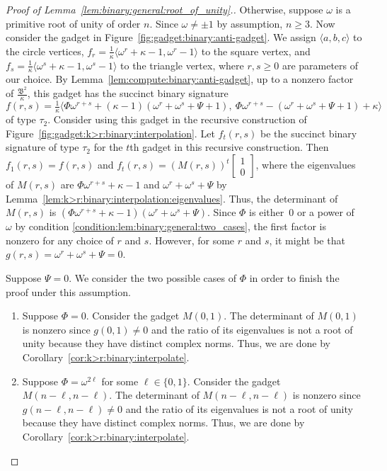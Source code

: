 \documentclass[11pt]{article}
\begin{document}
\begin{proof}[Proof of Lemma~\ref{lem:binary:general:root_of_unity}.]
 Otherwise, suppose $\omega$ is a primitive root of unity of order $n$.
 Since $\omega \not = \pm 1$ by assumption, $n \ge 3$.
 Now consider the gadget in Figure~\ref{fig:gadget:binary:anti-gadget}.
 We assign $\langle a,b,c \rangle$ to the circle vertices,
 $f_r = \frac{1}{\kappa} \langle \omega^r + \kappa - 1, \omega^r - 1 \rangle$ to the square vertex,
 and $f_s = \frac{1}{\kappa} \langle \omega^s + \kappa - 1, \omega^s - 1 \rangle$ to the triangle vertex,
 where $r,s \ge 0$ are parameters of our choice.
 By Lemma~\ref{lem:compute:binary:anti-gadget},
 up to a nonzero factor of $\frac{\mathfrak{B}^2}{\kappa}$,
 this gadget has the succinct binary signature
 \[
  f(r,s) =
  \tfrac{1}{\kappa}
  \langle
   \Phi \omega^{r+s} + (\kappa - 1) (\omega^r + \omega^s + \Psi + 1),\ %
   \Phi \omega^{r+s} -              (\omega^r + \omega^s + \Psi + 1) + \kappa
  \rangle
 \]
 of type $\tau_2$.
 Consider using this gadget in the recursive construction of Figure~\ref{fig:gadget:k>r:binary:interpolation}.
 Let $f_t(r,s)$ be the succinct binary signature of type $\tau_2$ for the $t$th gadget in this recursive construction.
 Then $f_1(r,s) = f(r,s)$ and $f_t(r,s) = (M(r,s))^t \left[\begin{smallmatrix} 1 \\ 0 \end{smallmatrix}\right]$,
 where the eigenvalues of $M(r,s)$ are $\Phi \omega^{r+s} + \kappa - 1$ and $\omega^r + \omega^s + \Psi$ by Lemma~\ref{lem:k>r:binary:interpolation:eigenvalues}.
 Thus, the determinant of $M(r,s)$ is $(\Phi \omega^{r+s} + \kappa - 1) (\omega^r + \omega^s + \Psi)$.
 Since $\Phi$ is either~$0$ or a power of $\omega$ by condition \ref{condition:lem:binary:general:two_cases},
 the first factor is nonzero for any choice of $r$ and $s$.
 However, for some $r$ and $s$,
 it might be that $g(r,s) = \omega^r + \omega^s + \Psi = 0$.
 
 Suppose $\Psi = 0$.
 We consider the two possible cases of $\Phi$ in order to finish the proof under this assumption.
 \begin{enumerate}
  \item Suppose $\Phi = 0$.
  Consider the gadget $M(0, 1)$.
  The determinant of $M(0, 1)$ is nonzero since $g(0, 1) \ne 0$ and the ratio of its eigenvalues is not a root of unity because they have distinct complex norms.
  Thus, we are done by Corollary~\ref{cor:k>r:binary:interpolate}.
  
  \item Suppose $\Phi = \omega^{2 \ell}$ for some $\ell \in \{0,1\}$.
  Consider the gadget $M(n - \ell, n - \ell)$.
  The determinant of $M(n - \ell, n - \ell)$ is nonzero since $g(n - \ell, n - \ell) \ne 0$ and the ratio of its eigenvalues is not a root of unity because they have distinct complex norms.
  Thus, we are done by Corollary~\ref{cor:k>r:binary:interpolate}.
 \end{enumerate}
 

\end{proof}
\end{document}

